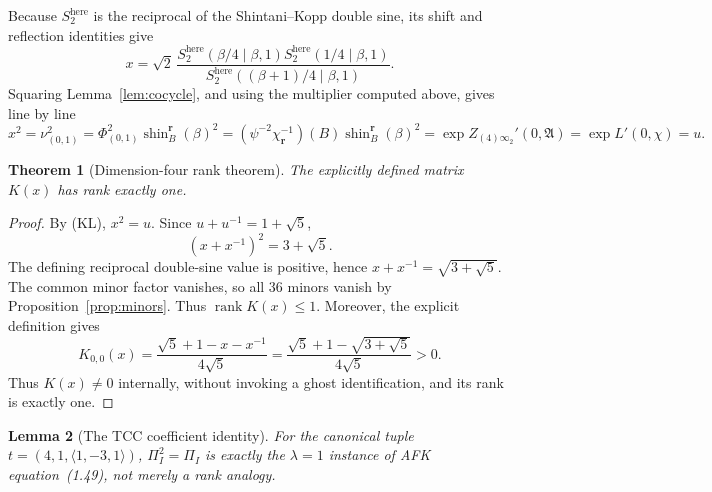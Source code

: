 \documentclass[11pt]{article}
\newtheorem{theorem}{Theorem}
\newtheorem{lemma}[theorem]{Lemma}
\begin{document}
Because $S_2^{\mathrm{here}}$ is the reciprocal of the
Shintani--Kopp double sine, its shift and reflection identities give
\[
x=\sqrt2\,
\frac{S_2^{\mathrm{here}}(\beta/4\mid\beta,1)
S_2^{\mathrm{here}}(1/4\mid\beta,1)}
{S_2^{\mathrm{here}}((\beta+1)/4\mid\beta,1)}.
\]
Squaring Lemma~\ref{lem:cocycle}, and using the multiplier computed
above, gives line by line
\[
x^2=\nu_{(0,1)}^2
=\Phi_{(0,1)}^2\operatorname{shin}^{\boldsymbol r}_{B}(\beta)^2
=(\psi^{-2}\chi_{\boldsymbol r}^{-1})(B)
  \operatorname{shin}^{\boldsymbol r}_{B}(\beta)^2
=\exp Z_{(4)\infty_2}'(0,\mathfrak A)
=\exp L'(0,\chi)=u.
\tag{KL}
\]

\begin{theorem}[Dimension-four rank theorem]\label{thm:reduction}
The explicitly defined matrix $K(x)$ has rank exactly one.
\end{theorem}

\begin{proof}
By \textup{(KL)}, $x^2=u$.  Since $u+u^{-1}=1+\sqrt5$,
\[
 (x+x^{-1})^2=3+\sqrt5.
\]
The defining reciprocal double-sine value is positive, hence
$x+x^{-1}=\sqrt{3+\sqrt5}$.  The common minor factor vanishes, so all
$36$ minors vanish by Proposition~\ref{prop:minors}.  Thus
$\operatorname{rank}K(x)\le1$.  Moreover, the explicit definition gives
\[
 K_{0,0}(x)=\frac{\sqrt5+1-x-x^{-1}}{4\sqrt5}
 =\frac{\sqrt5+1-\sqrt{3+\sqrt5}}{4\sqrt5}>0.
\]
Thus $K(x)\ne0$ internally, without invoking a ghost identification,
and its rank is exactly one.
\end{proof}

\begin{lemma}[The TCC coefficient identity]\label{lem:tccbridge}
For the canonical tuple
$t=(4,1,\langle1,-3,1\rangle)$, $\Pi_I^2=\Pi_I$ is exactly the
$\lambda=1$ instance of AFK equation~(1.49), not merely a rank
analogy.
\end{lemma}
\end{document}

